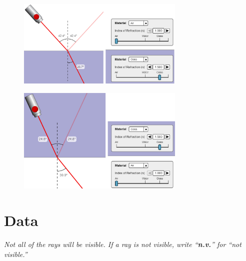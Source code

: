 \documentclass[10pt]{exam}
\begin{document}
\noindent
\begin{figure}[h]
  \centering
  \begin{minipage}[b]{8cm}
    \centering
    \includegraphics[width=8cm]{AG.png}
    \label{ag}
  \end{minipage}%
  \begin{minipage}[b]{8cm}
    \centering
    \includegraphics[width=8cm]{GA.png}
    \label{ga}
  \end{minipage}
\end{figure}


\pagebreak

\section*{Data}

\emph{Not all of the rays will be visible.  If a ray is not visible, write ``{\bf n.v.}'' for ``not visible.''}

\renewcommand{\arraystretch}{1.7}
\end{document}
